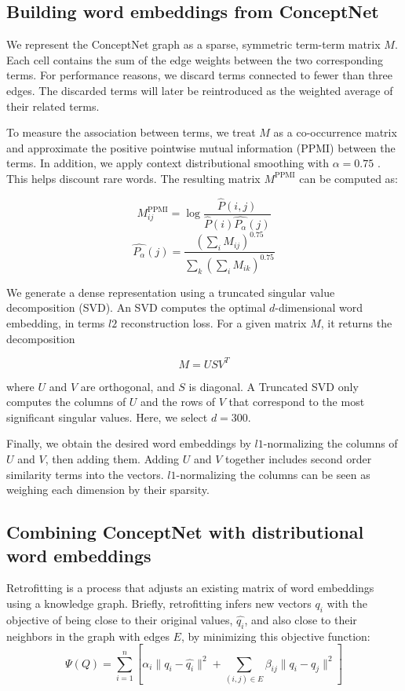 \documentclass[letterpaper]{article}
\begin{document}
\subsection{Building word embeddings from ConceptNet}

We represent the ConceptNet graph as a sparse, symmetric term-term matrix $M$.
Each cell contains the sum of the edge weights between the two corresponding
terms. For performance reasons, we discard terms connected to fewer than three
edges. The discarded terms will later be reintroduced as the weighted average of
their related terms.

To measure the association between terms, we treat $M$ as a co-occurrence
matrix and approximate the positive pointwise mutual information (PPMI) between
the terms. In addition, we apply context distributional smoothing with
$\alpha=0.75$ \cite{levy2015embeddings}. This helps discount rare words. The
resulting matrix $M^\text{PPMI}$ can be computed as:

$$
M^\text{PPMI}_{ij} =
\log \frac
  {\hat{P} \left(i, j\right)}
  {\hat{P} \left(i\right) \hat{P_\alpha} \left(j\right)}
$$
$$
\hat{P_\alpha} \left(j\right) =
\frac
  {\left(\sum_i{M_{ij}}\right)^{0.75}}
  {\sum_k{\left(\sum_i{M_{ik}}\right)^{0.75}}}
$$

We generate a dense representation using a truncated singular value
decomposition (SVD). An SVD computes the optimal $d$-dimensional word embedding,
in terms $l2$ reconstruction loss. For a given matrix $M$, it returns the
decomposition

$$
M = USV^T
$$

where $U$ and $V$ are orthogonal, and $S$ is diagonal. A Truncated SVD only
computes the columns of $U$ and the rows of $V$ that correspond to the most
significant singular values. Here, we select $d=300$.

Finally, we obtain the desired word embeddings by $l1$-normalizing the columns
of $U$ and $V$, then adding them. Adding $U$ and $V$ together includes second
order similarity terms into the vectors. $l1$-normalizing the columns can be
seen as weighing each dimension by their sparsity.

\subsection{Combining ConceptNet with distributional word embeddings}

Retrofitting \cite{faruqui2015retrofitting} is a process that adjusts an
existing matrix of word embeddings using a knowledge graph. Briefly, retrofitting
infers new vectors $q_i$ with the objective of being close to their original
values, $\hat{q_i}$, and also close to their neighbors in the graph with edges $E$,
by minimizing this objective function:
$$\Psi(Q) = \sum_{i=1}^{n}\left[
    \alpha_i \lVert q_i - \hat{q_i} \rVert ^2 + \sum_{(i, j) \in E} \beta_{ij} \lVert q_i - q_j \rVert ^2
\right] $$
\end{document}
